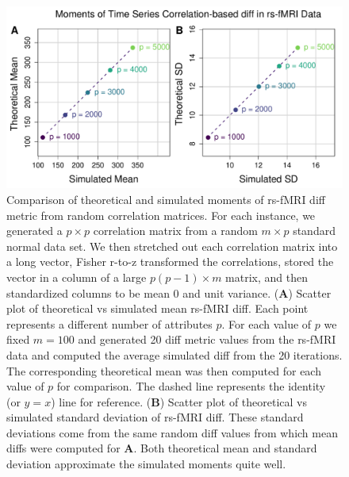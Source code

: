 \documentclass[10pt,letterpaper]{article}\usepackage[]{graphicx}\usepackage[]{color}
\begin{document}
\begin{figure}[H]
	\includegraphics[width=\textwidth]{compared_moments_rs-fMRI_diff.pdf}
	\caption{Comparison of theoretical and simulated moments of rs-fMRI diff metric from random correlation matrices. For each instance, we generated a $p \times p$ correlation matrix from a random $m \times p$ standard normal data set. We then stretched out each correlation matrix into a long vector, Fisher r-to-z transformed the correlations, stored the vector in a column of a large $p(p-1) \times m$ matrix, and then standardized columns to be mean 0 and unit variance. (\textbf{A}) Scatter plot of theoretical vs simulated mean rs-fMRI diff. Each point represents a different number of attributes $p$. For each value of $p$ we fixed $m=100$ and generated 20 diff metric values from the rs-fMRI data and computed the average simulated diff from the 20 iterations. The corresponding theoretical mean was then computed for each value of $p$ for comparison. The dashed line represents the identity (or $y=x$) line for reference. (\textbf{B}) Scatter plot of theoretical vs simulated standard deviation of rs-fMRI diff. These standard deviations come from the same random diff values from which mean diffs were computed for \textbf{A}. Both theoretical mean and standard deviation approximate the simulated moments quite well.}
\end{figure}
\end{document}
